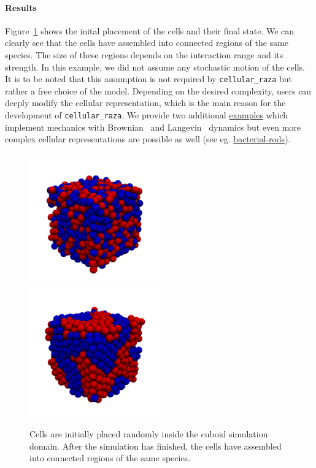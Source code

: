 \documentclass[fontsize=11pt,a4paper]{article}
\begin{document}
\paragraph{Results}
Figure~\ref{fig:cell-sorting-results} shows the inital placement of the cells and their final state.
We can clearly see that the cells have assembled into connected regions of the same species.
The size of these regions depends on the interaction range and its strength.
In this example, we did not assume any stochastic motion of the cells.
It is to be noted that this assumption is not required by \lstinline{cellular_raza} but rather a
free choice of the model.
Depending on the desired complexity, users can deeply modify the cellular representation, which is
the main reason for the development of \lstinline{cellular_raza}.
We provide two additional
\href{https://github.com/jonaspleyer/cellular_raza/cellular_raza-examples/cell_sorting}{examples}
which implement mechanics with Brownian~\cite{Schlick2002} and
Langevin~\cite{Schlick2002,Pastor1994} dynamics but even more complex cellular representations are
possible as well (see eg. \href{https://cellular-raza.com/showcase/bacterial-rods}{bacterial-rods}).

\begin{figure}
    \includegraphics[width=0.5\textwidth]{figures/cell_sorting/0000000020.png}%
    \includegraphics[width=0.5\textwidth]{figures/cell_sorting/0000010000.png}
    \caption{
        Cells are initially placed randomly inside the cuboid simulation domain.
        After the simulation has finished, the cells have assembled into connected regions of the
        same species.
    }
    \label{fig:cell-sorting-results}
\end{figure}
\end{document}
